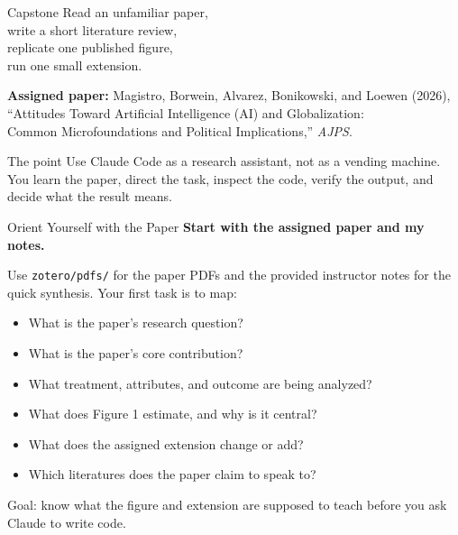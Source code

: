 \documentclass[aspectratio=169, 11pt]{beamer}
\begin{document}

\begin{frame}{Capstone}
  \centering
  \vspace{1.2em}
  {\Large Read an unfamiliar paper,\\[0.35em]
  write a short literature review,\\[0.35em]
  replicate one published figure,\\[0.35em]
  run one small extension.}

  \vspace{0.8em}
  {\scriptsize\textbf{Assigned paper:} Magistro, Borwein, Alvarez, Bonikowski, and Loewen (2026),\\
  ``Attitudes Toward Artificial Intelligence (AI) and Globalization:\\
  Common Microfoundations and Political Implications,'' \emph{AJPS}.}

  \vspace{0.8em}
  \begin{block}{The point}
    Use Claude Code as a research assistant, not as a vending machine. You learn the paper, direct the task, inspect the code, verify the output, and decide what the result means.
  \end{block}
\end{frame}

\begin{frame}{Orient Yourself with the Paper}
  \textbf{Start with the assigned paper and my notes.}

  \vspace{0.5em}
  Use \texttt{zotero/pdfs/} for the paper PDFs and the provided instructor notes for the quick synthesis. Your first task is to map:
  \begin{itemize}\small
    \item What is the paper's research question?
    \item What is the paper's core contribution?
    \item What treatment, attributes, and outcome are being analyzed?
    \item What does Figure 1 estimate, and why is it central?
    \item What does the assigned extension change or add?
    \item Which literatures does the paper claim to speak to?
  \end{itemize}

  \vspace{0.5em}
  \alert{\small Goal: know what the figure and extension are supposed to teach before you ask Claude to write code.}
\end{frame}
\end{document}
